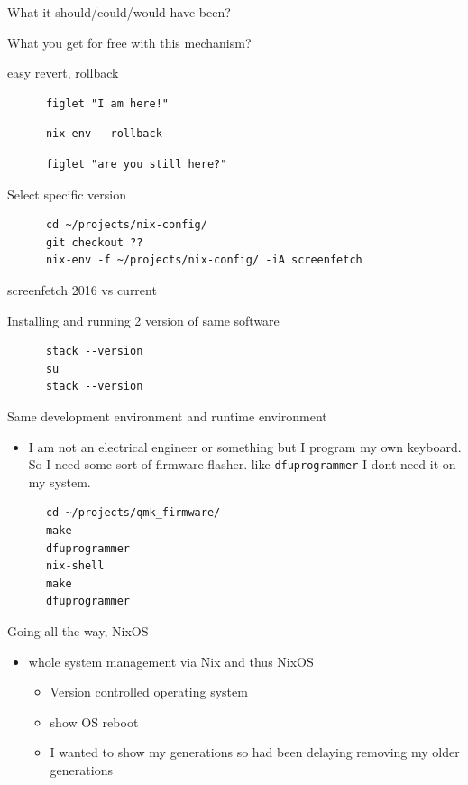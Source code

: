 \documentclass[presentation]{beamer}
\begin{document}
\begin{frame}[label={sec:org72632d2},fragile]{What it should/could/would have been?}
\begin{block}{What you get for free with this mechanism?}
\begin{block}{easy revert, rollback}
\begin{verbatim}
      figlet "I am here!"
\end{verbatim}
\begin{verbatim}
      nix-env --rollback
\end{verbatim}
\begin{verbatim}
      figlet "are you still here?"
\end{verbatim}
\end{block}
\begin{block}{Select specific version}
\begin{verbatim}
      cd ~/projects/nix-config/
      git checkout ??
      nix-env -f ~/projects/nix-config/ -iA screenfetch
\end{verbatim}
screenfetch 2016 vs current
\end{block}
\begin{block}{Installing and running 2 version of same software}
\begin{verbatim}
      stack --version
      su
      stack --version
\end{verbatim}
\end{block}
\begin{block}{Same development environment and runtime environment}
\begin{itemize}
\item I am not an electrical engineer or something but I program my
own keyboard. So I need some sort of firmware flasher. like
\texttt{dfuprogrammer} I dont need it on my system.
\end{itemize}
\begin{verbatim}
      cd ~/projects/qmk_firmware/
      make
      dfuprogrammer
      nix-shell
      make
      dfuprogrammer
\end{verbatim}
\end{block}
\end{block}
\begin{block}{Going all the way, NixOS}
\begin{itemize}
\item whole system management via Nix and thus NixOS
\begin{itemize}
\item Version controlled operating system
\item show OS reboot
\item I wanted to show my generations so had been delaying removing
my older generations
\end{itemize}

\end{itemize}
\end{block}
\end{frame}
\end{document}
